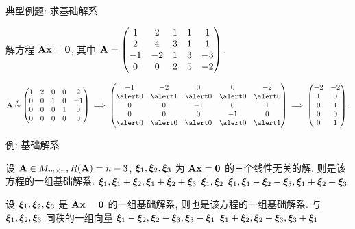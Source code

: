 \begin{frame}{典型例题: 求基础解系}
	\onslide<+->
	\begin{exercise}
		解方程 ${\mathbf{A}}{\mathbf{x}}={\bf0}$, 其中 ${\mathbf{A}}=\begin{pmatrix}
			1&2&1&1&1\\
			2&4&3&1&1\\
			-1&-2&1&3&-3\\
			0&0&2&5&-2
		\end{pmatrix}$.
	\end{exercise}
	\onslide<+->
	\begin{answer}
		\[\bfA\simr\begin{pmatrix}
			1&2&0&0&2\\
			0&0&1&0&-1\\
			0&0&0&1&0\\
			0&0&0&0&0
		\end{pmatrix}\implies\begin{pmatrix}
			-1&-2&0&0&-2\\
			\alert0&\alert1&\alert0&\alert0&\alert0\\
			0&0&-1&0&1\\
			0&0&0&-1&0\\
			\alert0&\alert0&\alert0&\alert0&\alert1
		\end{pmatrix}\implies\begin{pmatrix}
			-2&-2\\
			1&0\\
			0&1\\
			0&0\\
			0&1
		\end{pmatrix}.\]
	\end{answer}
\end{frame}


\begin{frame}{例: 基础解系}
	\onslide<+->
	\begin{example}
		设 ${\mathbf{A}}\in M_{m\times n}, R({\mathbf{A}})=n-3$, $\bmx_1,\bmx_2,\bmx_3$ 为 ${\mathbf{A}}{\mathbf{x}}={\bf0}$ 的三个线性无关的解.
		则是该方程的一组基础解系.
			{${\boldsymbol{\xi}}_1,{\boldsymbol{\xi}}_1+{\boldsymbol{\xi}}_2,{\boldsymbol{\xi}}_1+{\boldsymbol{\xi}}_2+{\boldsymbol{\xi}}_3$}%
			{${\boldsymbol{\xi}}_1,{\boldsymbol{\xi}}_2$}%
			{${\boldsymbol{\xi}}_1,{\boldsymbol{\xi}}_1-{\boldsymbol{\xi}}_2-{\boldsymbol{\xi}}_3,{\boldsymbol{\xi}}_1+{\boldsymbol{\xi}}_2+{\boldsymbol{\xi}}_3$}
	\end{example}
	\onslide<+->
	\begin{example}
		设 $\bmx_1,\bmx_2,\bmx_3$ 是 ${\mathbf{A}}{\mathbf{x}}={\bf0}$ 的一组基础解系, 则也是该方程的一组基础解系.
		\xx{与 $\bmx_1,\bmx_2,\bmx_3$ 等价的一组向量}%
			{与 $\bmx_1,\bmx_2,\bmx_3$ 同秩的一组向量}%
			{${\boldsymbol{\xi}}_1-{\boldsymbol{\xi}}_2,{\boldsymbol{\xi}}_2-{\boldsymbol{\xi}}_3,{\boldsymbol{\xi}}_3-{\boldsymbol{\xi}}_1$}%
			{${\boldsymbol{\xi}}_1+{\boldsymbol{\xi}}_2,{\boldsymbol{\xi}}_2+{\boldsymbol{\xi}}_3,{\boldsymbol{\xi}}_3+{\boldsymbol{\xi}}_1$}%
	\end{example}
\end{frame}


